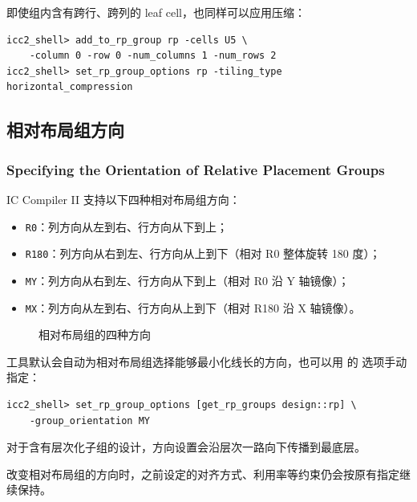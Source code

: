 即使组内含有跨行、跨列的 leaf cell，也同样可以应用压缩：
\begin{lstlisting}
icc2_shell> add_to_rp_group rp -cells U5 \
    -column 0 -row 0 -num_columns 1 -num_rows 2
icc2_shell> set_rp_group_options rp -tiling_type horizontal_compression
\end{lstlisting}

\subsection{相对布局组方向}
\subsubsection*{Specifying the Orientation of Relative Placement Groups}

IC Compiler II 支持以下四种相对布局组方向：
\begin{itemize}
  \item \texttt{R0}：列方向从左到右、行方向从下到上；
  \item \texttt{R180}：列方向从右到左、行方向从上到下（相对 R0 整体旋转 180 度）；
  \item \texttt{MY}：列方向从右到左、行方向从下到上（相对 R0 沿 Y 轴镜像）；
  \item \texttt{MX}：列方向从左到右、行方向从上到下（相对 R180 沿 X 轴镜像）。
\end{itemize}

\begin{figure}[htbp]
\centering
{}
\caption{相对布局组的四种方向}
\label{fig:rp-orient}
\end{figure}

工具默认会自动为相对布局组选择能够最小化线长的方向，也可以用  的  选项手动指定：
\begin{lstlisting}
icc2_shell> set_rp_group_options [get_rp_groups design::rp] \
    -group_orientation MY
\end{lstlisting}

对于含有层次化子组的设计，方向设置会沿层次一路向下传播到最底层。

\begin{noteBox}
改变相对布局组的方向时，之前设定的对齐方式、利用率等约束仍会按原有指定继续保持。
\end{noteBox}

